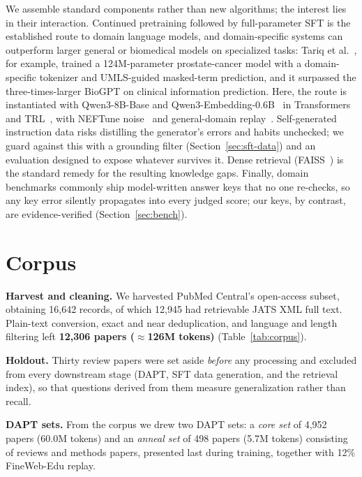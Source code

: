 \documentclass[11pt]{article}
\begin{document}
We assemble standard components rather than new algorithms; the
interest lies in their interaction. Continued pretraining followed by
full-parameter SFT is the established route to domain language models,
and domain-specific systems can outperform larger general
or biomedical models on specialized tasks: Tariq et
al.~\cite{tariq2024}, for example, trained a 124M-parameter
prostate-cancer model with a domain-specific tokenizer and UMLS-guided
masked-term prediction, and it surpassed the three-times-larger BioGPT
on clinical information prediction. Here, the route is instantiated
with Qwen3-8B-Base and Qwen3-Embedding-0.6B~\cite{qwen3} in
Transformers and TRL~\cite{transformers,trl}, with NEFTune
noise~\cite{neftune} and general-domain replay~\cite{fineweb}.
Self-generated instruction data risks distilling the generator's errors
and habits unchecked; we guard against this with a grounding filter
(Section~\ref{sec:sft-data}) and an evaluation designed to expose
whatever survives it. Dense retrieval (FAISS~\cite{faiss}) is the
standard remedy for the resulting knowledge gaps. Finally, domain
benchmarks commonly ship model-written answer keys that no one
re-checks, so any key error silently propagates into every judged
score; our keys, by contrast, are evidence-verified
(Section~\ref{sec:bench}).

\section{Corpus}
\label{sec:corpus}

\textbf{Harvest and cleaning.} We harvested PubMed Central's
open-access subset, obtaining 16,642 records, of which 12,945 had
retrievable JATS XML full text. Plain-text conversion, exact and near
deduplication, and language and length filtering left \textbf{12,306
papers ($\approx$126M tokens)} (Table~\ref{tab:corpus}).

\textbf{Holdout.} Thirty review papers were set aside \emph{before}
any processing and excluded from every downstream stage (DAPT, SFT
data generation, and the retrieval index), so that questions derived
from them measure generalization rather than recall.

\textbf{DAPT sets.} From the corpus we drew two DAPT sets: a
\emph{core set} of 4,952 papers (60.0M tokens) and an \emph{anneal set}
of 498 papers (5.7M tokens) consisting of reviews and methods papers,
presented last during training, together with 12\% FineWeb-Edu replay.
\end{document}
